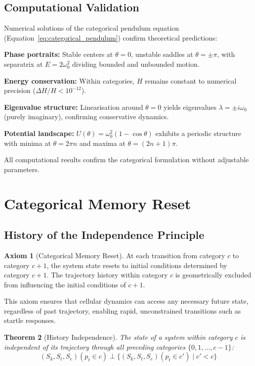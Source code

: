 \documentclass[11pt,twocolumn,a4paper]{article}
\newtheorem{theorem}{Theorem}[section]
\theoremstyle{definition}
\newtheorem{axiom}[theorem]{Axiom}
\theoremstyle{remark}
\newcommand{\Scoord}{(\Sk,\St,\Se)}
\newcommand{\Sk}{S_k}
\newcommand{\St}{S_t}
\newcommand{\Se}{S_e}
\begin{document}
\subsection{Computational Validation}

Numerical solutions of the categorical pendulum equation (Equation~\eqref{eq:categorical_pendulum}) confirm theoretical predictions:

\textbf{Phase portraits:} Stable centers at $\theta = 0$, unstable saddles at $\theta = \pm\pi$, with separatrix at $E = 2\omega_0^2$ dividing bounded and unbounded motion.

\textbf{Energy conservation:} Within categories, $H$ remains constant to numerical precision ($\Delta H/H < 10^{-12}$).

\textbf{Eigenvalue structure:} Linearisation around $\theta = 0$ yields eigenvalues $\lambda = \pm i\omega_0$ (purely imaginary), confirming conservative dynamics.

\textbf{Potential landscape:} $U(\theta) = \omega_0^2(1-\cos\theta)$ exhibits a periodic structure with minima at $\theta = 2\pi n$ and maxima at $\theta = (2n+1)\pi$.

All computational results confirm the categorical formulation without adjustable parameters.

\section{Categorical Memory Reset}
\label{sec:memory_reset}

\subsection{History of the Independence Principle}

\begin{axiom}[Categorical Memory Reset]
\label{ax:memory_reset}
At each transition from category $c$ to category $c+1$, the system state resets to initial conditions determined by category $c+1$. The trajectory history within category $c$ is geometrically excluded from influencing the initial conditions of $c+1$.
\end{axiom}

This axiom ensures that cellular dynamics can access any necessary future state, regardless of past trajectory, enabling rapid, unconstrained transitions such as startle responses.

\begin{theorem}[History Independence]
\label{thm:history_independence}
The state of a system within category $c$ is independent of its trajectory through all preceding categories $\{0,1,\ldots,c-1\}$:
\begin{equation}
\Scoord(p_t \in c) \perp \{\Scoord(p_t \in c') \mid c' < c\}
\label{eq:history_independence}
\end{equation}
\end{theorem}
\end{document}
